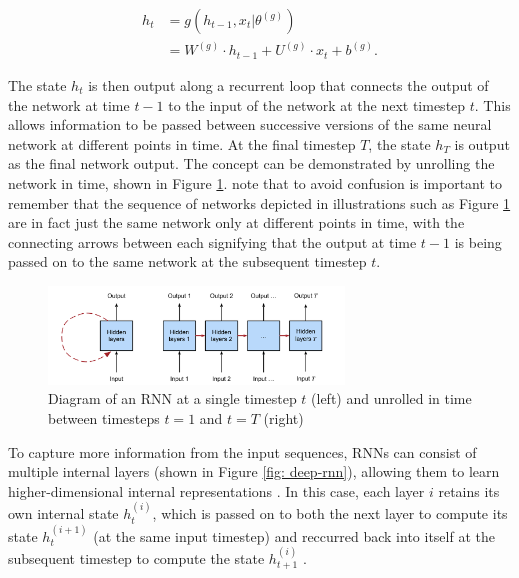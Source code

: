 \documentclass[a4paper, 11pt]{report}
\begin{document}
    \begin{align}
        \label{eq: rnn-state}
        h_t &= g( h_{t-1}, x_t \vert \theta^{(g)} ) \\
        &= W^{(g)} \cdot h_{t-1} + U^{(g)} \cdot x_t + b^{(g)}
        \text{.}
    \end{align}

    The state $h_t$ is then output along a recurrent loop that connects the output of the network at time $t-1$ to the input of the network at the next timestep $t$. This allows information to be passed between successive versions of the same neural network at different points in time. At the final timestep $T$, the state $h_T$ is output as the final network output. The concept can be demonstrated by unrolling the network in time, shown in Figure \ref{fig: rnn-diagram}. \citet{tsantekidis-2022} note that to avoid confusion is important to remember that the sequence of networks depicted in illustrations such as Figure \ref{fig: rnn-diagram} are in fact just the same network only at different points in time, with the connecting arrows between each signifying that the output at time $t-1$ is being passed on to the same network at the subsequent timestep $t$.

    \begin{figure}[ht]
        \centering
        \includegraphics[width=0.7\textwidth]{rnn.png}
        \caption{\centering Diagram of an RNN at a single timestep $t$ (left) and unrolled in time between timesteps $t=1$ and $t=T$ (right) \citep{zhang-2021}}
        \label{fig: rnn-diagram}
    \end{figure}

    To capture more information from the input sequences, RNNs can consist of multiple internal layers (shown in Figure \ref{fig: deep-rnn}), allowing them to learn higher-dimensional internal representations \citep{bengio-2009}. In this case, each layer $i$ retains its own internal state $h^{(i)}_t$, which is passed on to both the next layer to compute its state $h^{(i+1)}_t$ (at the same input timestep) and reccurred back into itself at the subsequent timestep to compute the state $h^{(i)}_{t+1}$ \citep{zhang-2021}. 
\end{document}
